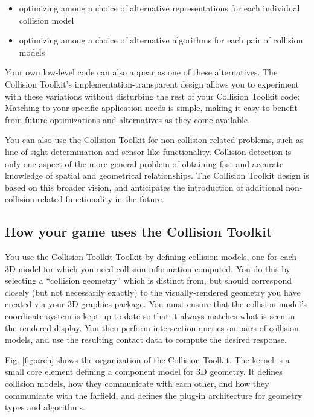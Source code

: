 \documentclass[11pt]{article}
\begin{document}
\begin{itemize} 
\item optimizing among a choice of alternative representations for each
individual collision model
\item optimizing among a choice of alternative algorithms for each
pair of collision models
\end{itemize}

Your own low-level code can also appear as one of these alternatives.
The Collision Toolkit's implementation-transparent design allows you to experiment with these
variations without disturbing the rest of your Collision Toolkit code:
 Matching to your specific application needs is simple, making it easy to benefit from future optimizations and alternatives as they come available.

You can also use the Collision Toolkit for non-collision-related problems, such as
line-of-sight determination and sensor-like functionality. 
Collision detection is only one aspect of the more general problem of
obtaining fast and accurate knowledge of spatial and geometrical 
relationships.
The Collision Toolkit design is based on this broader vision, and anticipates the
introduction of additional non-collision-related functionality in the future.



\subsection{ How your game uses the Collision Toolkit }
\label{sec:design}

You use the Collision Toolkit Toolkit by defining collision models, one for each 3D model for which
you need collision information computed.
You do this by selecting a ``collision geometry'' which is distinct from,
but 
should correspond closely (but not necessarily exactly) to
the visually-rendered geometry you have created via your 3D graphics package.
You must ensure that the collision model's coordinate system is kept
up-to-date so that it always matches what is seen in the rendered display.
You then perform intersection queries on pairs of collision models, and use the
resulting contact data to compute the desired response. 

Fig. \ref{fig:arch} shows the organization of the Collision Toolkit.
The kernel is a small core element defining a component
model for 3D geometry. 
It defines collision models, 
how they communicate with each other,
and how they communicate with the
farfield, and defines 
the plug-in architecture for geometry types and
algorithms. 
\end{document}
